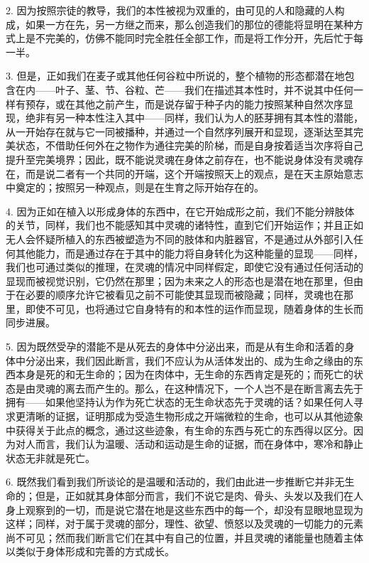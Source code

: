 2. 因为按照宗徒的教导，我们的本性被视为双重的，由可见的人和隐藏的人构成，如果一方在先，另一方继之而来，那么创造我们的那位的德能将显明在某种方式上是不完美的，仿佛不能同时完全胜任全部工作，而是将工作分开，先后忙于每一半。\par

3. 但是，正如我们在麦子或其他任何谷粒中所说的，整个植物的形态都潜在地包含在内——叶子、茎、节、谷粒、芒——我们在描述其本性时，并不说其中任何一样有预存，或在其他之前产生，而是说存留于种子内的能力按照某种自然次序显现，绝非有另一种本性注入其中——同样，我们认为人的胚芽拥有其本性的潜能，从一开始存在就与它一同被播种，并通过一个自然序列展开和显现，逐渐达至其完美状态，不借助任何外在之物作为通往完美的阶梯，而是自身按着适当次序将自己提升至完美境界；因此，既不能说灵魂在身体之前存在，也不能说身体没有灵魂存在，而是说二者有一个共同的开端，这个开端按照天上的观点，是在天主原始意志中奠定的；按照另一种观点，则是在生育之际开始存在的。\par

4. 因为正如在植入以形成身体的东西中，在它开始成形之前，我们不能分辨肢体的关节，同样，我们也不能感知其中灵魂的诸特性，直到它们开始运作；并且正如无人会怀疑所植入的东西被塑造为不同的肢体和内脏器官，不是通过从外部引入任何其他能力，而是通过存在于其中的能力将自身转化为这种能量的显现——同样，我们也可通过类似的推理，在灵魂的情况中同样假定，即使它没有通过任何活动的显现而被视觉识别，它仍然在那里；因为未来之人的形态也是潜在地在那里，但由于在必要的顺序允许它被看见之前不可能使其显现而被隐藏；同样，灵魂也在那里，即使不可见，也将通过它自身特有的和本性的运作而显现，随着身体的生长而同步进展。\par

5. 因为既然受孕的潜能不是从死去的身体中分泌出来，而是从有生命和活着的身体中分泌出来，我们因此断言，我们不应认为从活体发出的、成为生命之缘由的东西本身是死的和无生命的；因为在肉体中，无生命的东西肯定是死的；而死亡的状态是由灵魂的离去而产生的。那么，在这种情况下，一个人岂不是在断言离去先于拥有——如果他坚持认为作为死亡状态的无生命状态先于灵魂的话？如果任何人寻求更清晰的证据，证明那成为受造生物形成之开端微粒的生命，也可以从其他迹象中获得关于此点的概念，通过这些迹象，有生命的东西与死亡的东西得以区分。因为对人而言，我们认为温暖、活动和运动是生命的证据，而在身体中，寒冷和静止状态无非就是死亡。\par

6. 既然我们看到我们所谈论的是温暖和活动的，我们由此进一步推断它并非无生命的；但是，正如就其身体部分而言，我们不说它是肉、骨头、头发以及我们在人身上观察到的一切，而是说它潜在地是这些东西中的每一个，却没有显眼地显现为这样；同样，对于属于灵魂的部分，理性、欲望、愤怒以及灵魂的一切能力的元素尚不可见；然而我们断言它们在其中有自己的位置，并且灵魂的诸能量也随着主体以类似于身体形成和完善的方式成长。\par

